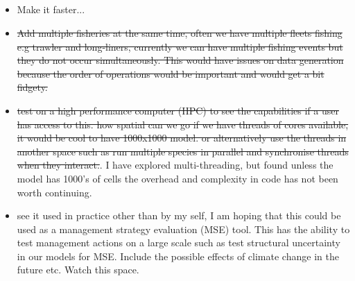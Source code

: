 \subsection{}


\begin{itemize}
	\item Make it faster...
	\item \sout{Add multiple fisheries at the same time, often we have multiple fleets fishing e.g trawler and long-liners, currently we can have multiple fishing events but they do not occur simultaneously. This would have issues on data generation because the order of operations would be important and would get a bit fidgety.}
	\item \sout{test on a high performance computer (HPC) to see the capabilities if a user has access to this. how spatial can we go if we have threads of cores available, it would be cool to have 1000x1000 model. or alternatively use the threads in another space such as run multiple species in parallel and synchronise threads when they interact.}. I have explored multi-threading, but found unless the model has 1000's of  cells the overhead and complexity in code has not been worth continuing. 
	\item see it used in practice other than by my self, I am hoping that this could be used as a management strategy evaluation (MSE) tool. This has the ability to test management actions on a large scale such as test structural uncertainty in our models for MSE. Include the possible effects of climate change in the future etc. Watch this space.
\end{itemize}



